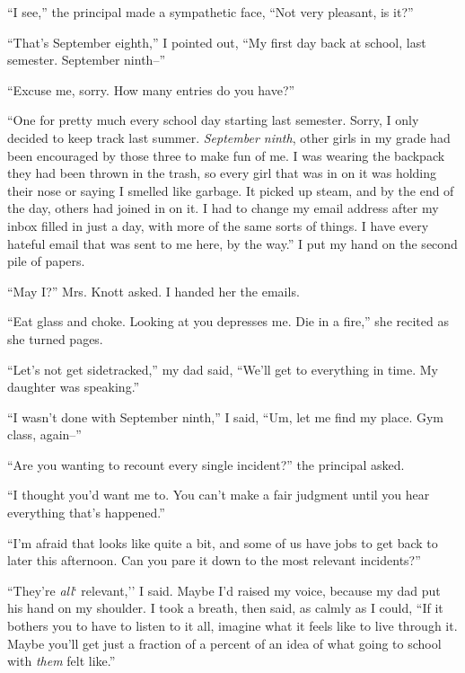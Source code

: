 ``I see,'' the principal made a sympathetic face, ``Not very pleasant, is it?''



``That's September eighth,'' I pointed out, ``My first day back at school, last semester.  September ninth--''



``Excuse me, sorry.  How many entries do you have?''



``One for pretty much every school day starting last semester.  Sorry, I only decided to keep track last summer.  \emph{September ninth}, other girls in my grade had been encouraged by those three to make fun of me.  I was wearing the backpack they had been thrown in the trash, so every girl that was in on it was holding their nose or saying I smelled like garbage.  It picked up steam, and by the end of the day, others had joined in on it.  I had to change my email address after my inbox filled in just a day, with more of the same sorts of things.  I have every hateful email that was sent to me here, by the way.''  I put my hand on the second pile of papers.



``May I?'' Mrs. Knott asked.  I handed her the emails.



``Eat glass and choke.  Looking at you depresses me.  Die in a fire,'' she recited as she turned pages.



``Let's not get sidetracked,'' my dad said, ``We'll get to everything in time.  My daughter was speaking.''



``I wasn't done with September ninth,'' I said, ``Um, let me find my place.  Gym class, again--''



``Are you wanting to recount every single incident?'' the principal asked.



``I thought you'd want me to.  You can't make a fair judgment until you hear everything that's happened.''



``I'm afraid that looks like quite a bit, and some of us have jobs to get back to later this afternoon.  Can you pare it down to the most relevant incidents?''



``They're \emph{all}` relevant,'' I said.  Maybe I'd raised my voice, because my dad put his hand on my shoulder.  I took a breath, then said, as calmly as I could, ``If it bothers you to have to listen to it all, imagine what it feels like to live through it.  Maybe you'll get just a fraction of a percent of an idea of what going to school with \emph{them} felt like.''



